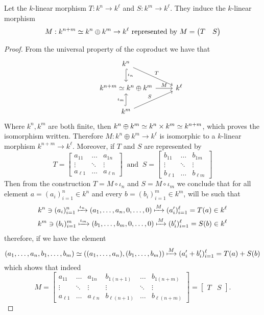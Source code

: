 \begin{proposition}
  Let the \(k\)-linear morphism \(T : k^n \to k^\ell\) and \(S : k^m \to
  k^\ell\). They induce the \(k\)-linear morphism
  \[
    M : k^{n+m} \simeq k^n \oplus k^m \to k^\ell \text{ represented by }
    M = \begin{pmatrix} T &S \end{pmatrix}
  \]
\end{proposition}

\begin{proof}
   From the universal property of the coproduct we have that
   \[
     \begin{tikzcd}
        &k^n \ar[hook, "\iota_n", d]  \ar[dr, "T"]& \\
        & k^{n+m} \iso k^n \oplus k^m \ar[r, "M"] &k^\ell \\
        &k^m \ar[hook, "\iota_m", u] \ar[ur, "S"] &
     \end{tikzcd}
   \]
   Where \(k^n, k^m\) are both finite, then \(k^n \oplus k^m \simeq k^n \times k^m
   \simeq k^{n+m}\), which proves the isomorphism written. Therefore \(M : k^n
   \oplus k^m \to k^\ell\) is isomorphic to a \(k\)-linear morphism \(k^{n+m}
   \to k^\ell\). Moreover, if \(T\) and \(S\) are represented by
   \[
    T =
    \begin{bmatrix}
      a_{11} &\dots &a_{1n} \\
      \vdots &\ddots &\vdots \\
      a_{\ell 1} &\dots & a_{\ell n}
    \end{bmatrix}
    \ \text{ and }\
    S =
    \begin{bmatrix}
      b_{11} &\dots &b_{1m} \\
      \vdots &\ddots &\vdots \\
      b_{\ell 1} &\dots & b_{\ell m}
    \end{bmatrix}
   \]
   Then from the construction \(T = M \circ \iota_n\) and \(S = M \circ
   \iota_m\) we conclude that for all element \(a = (a_i)_{i=1}^n \in k^n\) and
   every \(b = (b_i)_{i=1}^m \in k^m\), will be such that
   \begin{gather*}
     k^n \ni (a_i)_{i=1}^n \xmapsto{\iota_n} (a_1, \dots, a_n, 0, \dots, 0)
     \xmapsto{M} (a'_i)_{i=1}^\ell = T(a) \in k^\ell
     \\
     k^m \ni (b_i)_{i=1}^m \xmapsto{\iota_m} (b_1, \dots, b_m, 0, \dots, 0)
     \xmapsto{M} (b'_i)_{i=1}^\ell = S(b) \in k^\ell
   \end{gather*}
   therefore, if we have the element
   \[
     (a_1, \dots, a_n, b_1, \dots, b_m) \simeq \left( (a_1, \dots, a_n), (b_1,
     \dots, b_m) \right) \xmapsto M (a'_i + b'_i)_{i=1}^\ell = T(a) + S(b)
   \]
   which shows that indeed
   \[
     M =
     \begin{bmatrix}
       a_{11} &\dots &a_{1n} &b_{1(n+1)} &\dots &b_{1(n+m)} \\
       \vdots &\ddots &\vdots &\vdots &\ddots &\vdots\\
       a_{\ell 1} &\dots & a_{\ell n} &b_{\ell (n+1)} &\dots &b_{\ell(n+m)}
     \end{bmatrix}
     =
     \begin{bmatrix}
       T &S
     \end{bmatrix}
     .
   \]
\end{proof}

